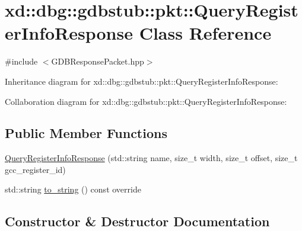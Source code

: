 \hypertarget{classxd_1_1dbg_1_1gdbstub_1_1pkt_1_1_query_register_info_response}{}\section{xd\+:\+:dbg\+:\+:gdbstub\+:\+:pkt\+:\+:Query\+Register\+Info\+Response Class Reference}
\label{classxd_1_1dbg_1_1gdbstub_1_1pkt_1_1_query_register_info_response}


{\ttfamily \#include $<$G\+D\+B\+Response\+Packet.\+hpp$>$}



Inheritance diagram for xd\+:\+:dbg\+:\+:gdbstub\+:\+:pkt\+:\+:Query\+Register\+Info\+Response\+:


Collaboration diagram for xd\+:\+:dbg\+:\+:gdbstub\+:\+:pkt\+:\+:Query\+Register\+Info\+Response\+:
\subsection*{Public Member Functions}
\begin{DoxyCompactItemize}
\item 
\mbox{\hyperlink{classxd_1_1dbg_1_1gdbstub_1_1pkt_1_1_query_register_info_response_a43426a87138b42ea8e027fdf592393cd}{Query\+Register\+Info\+Response}} (std\+::string name, size\+\_\+t width, size\+\_\+t offset, size\+\_\+t gcc\+\_\+register\+\_\+id)
\item 
std\+::string \mbox{\hyperlink{classxd_1_1dbg_1_1gdbstub_1_1pkt_1_1_query_register_info_response_a8457843896d4af60c23846aab4463469}{to\+\_\+string}} () const override
\end{DoxyCompactItemize}


\subsection{Constructor \& Destructor Documentation}
\mbox{\label{classxd_1_1dbg_1_1gdbstub_1_1pkt_1_1_query_register_info_response_a43426a87138b42ea8e027fdf592393cd}} 

